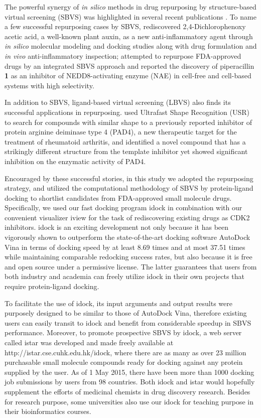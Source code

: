 \documentclass[10pt,letterpaper]{article}
\begin{document}
The powerful synergy of \textit{in silico} methods in drug repurposing by structure-based virtual screening (SBVS) was highlighted in several recent publications \cite{1384}. To name a few successful repurposing cases by SBVS, \cite{1507} rediscovered 2,4-Dichlorophenoxy acetic acid, a well-known plant auxin, as a new anti-inflammatory agent through \textit{in silico} molecular modeling and docking studies along with drug formulation and \textit{in vivo} anti-inflammatory inspection; \cite{1506} attempted to repurpose FDA-approved drugs by an integrated SBVS approach and reported the discovery of piperacillin \textbf{1} as an inhibitor of NEDD8-activating enzyme (NAE) in cell-free and cell-based systems with high selectivity.

In addition to SBVS, ligand-based virtual screening (LBVS) also finds its successful applications in repurposing. \cite{1504} used Ultrafast Shape Recognition (USR) \cite{1379} to search for compounds with similar shape to a previously reported inhibitor of protein arginine deiminase type 4 (PAD4), a new therapeutic target for the treatment of rheumatoid arthritis, and identified a novel compound that has a strikingly different structure from the template inhibitor yet showed significant inhibition on the enzymatic activity of PAD4.

Encouraged by these successful stories, in this study we adopted the repurposing strategy, and utilized the computational methodology of SBVS by protein-ligand docking to shortlist candidates from FDA-approved small molecule drugs. Specifically, we used our fast docking program idock \cite{1153,1362} in combination with our convenient visualizer iview \cite{1366} for the task of rediscovering existing drugs as CDK2 inhibitors. idock is an exciting development not only because it has been vigorously shown \cite{1362} to outperform the state-of-the-art docking software AutoDock Vina \cite{595} in terms of docking speed by at least 8.69 times and at most 37.51 times while maintaining comparable redocking success rates, but also because it is free and open source under a permissive license. The latter guarantees that users from both industry and academia can freely utilize idock in their own projects that require protein-ligand docking.

To facilitate the use of idock, its input arguments and output results were purposely designed to be similar to those of AutoDock Vina, therefore existing users can easily transit to idock and benefit from considerable speedup in SBVS performance. Moreover, to promote prospective SBVS by idock, a web server called istar \cite{1362} was developed and made freely available at http://istar.cse.cuhk.edu.hk/idock, where there are as many as over 23 million purchasable small molecule compounds ready for docking against any protein supplied by the user. As of 1 May 2015, there have been more than 1000 docking job submissions by users from 98 countries. Both idock \cite{1153} and istar \cite{1362} would hopefully supplement the efforts of medicinal chemists in drug discovery research. Besides for research purpose, some universities also use our idock for teaching purpose in their bioinformatics courses.
\end{document}
